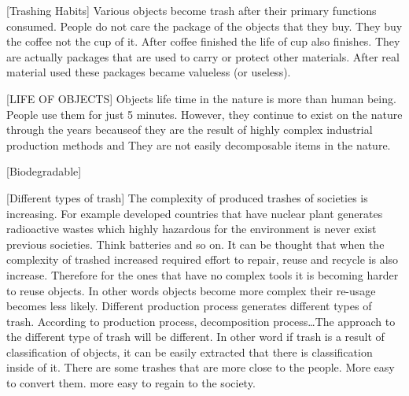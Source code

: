 


[Trashing Habits] Various objects become trash after their primary functions consumed. People do not care the package of the objects that they buy. They buy the coffee not the cup of it. After coffee finished the life of cup also finishes. They are actually packages that are used to carry or protect other materials. After real material used these packages became valueless (or useless).



[LIFE OF OBJECTS] Objects life time in the nature is more than human being. People use them for just 5 minutes. However, they continue to exist on the nature through the years becauseof they are the result of highly complex industrial production methods and They are not easily decomposable items in the nature. 


[Biodegradable] 



[Different types of trash] The complexity of produced trashes of societies is increasing. For example developed countries that have nuclear plant generates radioactive wastes which highly hazardous for the environment is never exist previous societies. Think batteries and so on.  It can be thought that when the complexity of trashed increased required effort to repair, reuse and recycle is also increase. Therefore for the ones that have no complex tools it is becoming harder to reuse objects. In other words objects become more complex their re-usage becomes less likely.  Different production process generates different types of trash. According to production process, decomposition process\ldots The approach to the different type of trash will be different. In other word if trash is a result of classification of objects, it can be easily extracted that there is classification inside of it. There are some trashes that are more close to the people. More easy to convert them. more easy to regain to the society. 



